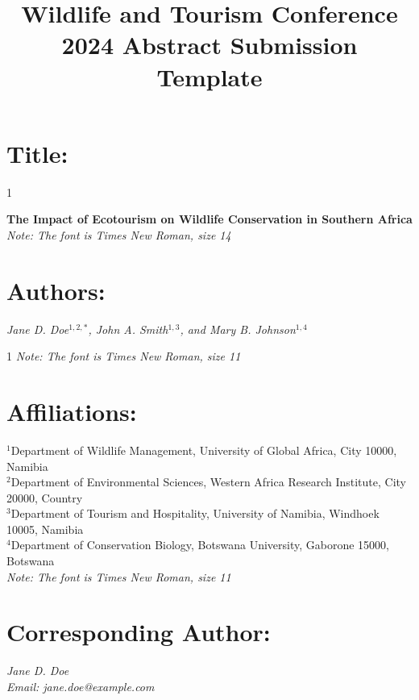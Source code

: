 \documentclass[11pt]{article}
\title{\textbf{Wildlife and Tourism Conference 2024 Abstract Submission Template}}
\date{}
\begin{document}
\maketitle

\section*{Title:}
\begin{spacing}{1}
\begin{flushleft}
\textbf{\textbf{The Impact of Ecotourism on Wildlife Conservation in Southern Africa}} \\
\textit{Note: The font is Times New Roman, size 14}
\end{flushleft}
\end{spacing}

\section*{Authors:}
\begin{flushleft}
\textit{Jane D. Doe$^{1,2,*}$, John A. Smith$^{1,3}$, and Mary B. Johnson$^{1,4}$}
\begin{spacing}{1}
\textit{Note: The font is Times New Roman, size 11}
\end{spacing}
\end{flushleft}

\section*{Affiliations:}
\begin{flushleft}
$^{1}$Department of Wildlife Management, University of Global Africa, City 10000, Namibia \\
$^{2}$Department of Environmental Sciences, Western Africa Research Institute, City 20000, Country \\
$^{3}$Department of Tourism and Hospitality, University of Namibia, Windhoek 10005, Namibia \\
$^{4}$Department of Conservation Biology, Botswana University, Gaborone 15000, Botswana \\
\textit{Note: The font is Times New Roman, size 11}
\end{flushleft}

\section*{Corresponding Author:}
\begin{flushleft}
\textit{Jane D. Doe} \\
\textit{Email: jane.doe@example.com}
\end{flushleft}
\end{document}
